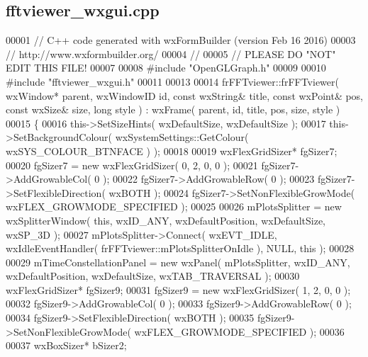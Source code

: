 \subsection{fftviewer\+\_\+wxgui.\+cpp}
\label{fftviewer__wxgui_8cpp_source}

\begin{DoxyCode}
00001 \textcolor{comment}{// C++ code generated with wxFormBuilder (version Feb 16 2016)}
00003 \textcolor{comment}{// http://www.wxformbuilder.org/}
00004 \textcolor{comment}{//}
00005 \textcolor{comment}{// PLEASE DO "NOT" EDIT THIS FILE!}
00007 \textcolor{comment}{}
00008 \textcolor{preprocessor}{#include "OpenGLGraph.h"}
00009 
00010 \textcolor{preprocessor}{#include "fftviewer_wxgui.h"}
00011 
00013 
00014 frFFTviewer::frFFTviewer( wxWindow* parent, wxWindowID \textcolor{keywordtype}{id}, \textcolor{keyword}{const} wxString& title, \textcolor{keyword}{const} wxPoint& pos, \textcolor{keyword}{const}
       wxSize& size, \textcolor{keywordtype}{long} style ) : wxFrame( parent, id, title, pos, size, style )
00015 \{
00016     this->SetSizeHints( wxDefaultSize, wxDefaultSize );
00017     this->SetBackgroundColour( wxSystemSettings::GetColour( wxSYS\_COLOUR\_BTNFACE ) );
00018     
00019     wxFlexGridSizer* fgSizer7;
00020     fgSizer7 = \textcolor{keyword}{new} wxFlexGridSizer( 0, 2, 0, 0 );
00021     fgSizer7->AddGrowableCol( 0 );
00022     fgSizer7->AddGrowableRow( 0 );
00023     fgSizer7->SetFlexibleDirection( wxBOTH );
00024     fgSizer7->SetNonFlexibleGrowMode( wxFLEX\_GROWMODE\_SPECIFIED );
00025     
00026     mPlotsSplitter = \textcolor{keyword}{new} wxSplitterWindow( \textcolor{keyword}{this}, wxID\_ANY, wxDefaultPosition, wxDefaultSize, wxSP\_3D );
00027     mPlotsSplitter->Connect( wxEVT\_IDLE, wxIdleEventHandler( 
      frFFTviewer::mPlotsSplitterOnIdle ), NULL, \textcolor{keyword}{this} );
00028     
00029     mTimeConstellationPanel = \textcolor{keyword}{new} wxPanel( mPlotsSplitter, wxID\_ANY, wxDefaultPosition, wxDefaultSize, 
      wxTAB\_TRAVERSAL );
00030     wxFlexGridSizer* fgSizer9;
00031     fgSizer9 = \textcolor{keyword}{new} wxFlexGridSizer( 1, 2, 0, 0 );
00032     fgSizer9->AddGrowableCol( 0 );
00033     fgSizer9->AddGrowableRow( 0 );
00034     fgSizer9->SetFlexibleDirection( wxBOTH );
00035     fgSizer9->SetNonFlexibleGrowMode( wxFLEX\_GROWMODE\_SPECIFIED );
00036     
00037     wxBoxSizer* bSizer2;

\end{DoxyCode}
